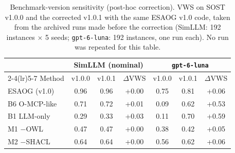 \begin{table}[H]
\centering
\caption{Benchmark-version sensitivity (post-hoc correction). VWS on SOST v1.0.0 and the corrected v1.0.1 with the same ESAOG v1.0 code, taken from the archived runs made before the correction (SimLLM: 192 instances $\times$ 5 seeds; \texttt{gpt-6-luna}: 192 instances, one run each). No run was repeated for this table.}
\label{tab:benchver}
\scriptsize
\begin{tabular}{lcccccc}
\toprule
& \multicolumn{3}{c}{SimLLM (nominal)} & \multicolumn{3}{c}{\texttt{gpt-6-luna}}\\
\cmidrule(lr){2-4}\cmidrule(lr){5-7}
Method & v1.0.0 & v1.0.1 & $\Delta$VWS & v1.0.0 & v1.0.1 & $\Delta$VWS\\
\midrule
ESAOG (v1.0) & 0.96 & 0.96 & +0.00 & 0.75 & 0.81 & +0.06\\
B6 O-MCP-like & 0.71 & 0.72 & +0.01 & 0.09 & 0.62 & +0.53\\
B1 LLM-only & 0.29 & 0.33 & +0.03 & 0.11 & 0.70 & +0.59\\
M1 $-$OWL & 0.47 & 0.47 & +0.00 & 0.38 & 0.42 & +0.05\\
M2 $-$SHACL & 0.64 & 0.64 & +0.00 & 0.56 & 0.62 & +0.06\\
\bottomrule
\end{tabular}
\end{table}
